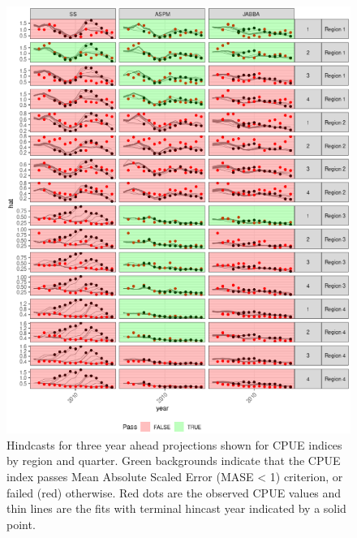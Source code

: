 \documentclass[12pt,halfline,a4paper,nonumbib]{ouparticle}
\begin{document}
\begin{figure}[htbp]
\centering
\includegraphics[width=6in]{fig5.eps}
\caption{Hindcasts for three year ahead projections shown for CPUE indices by region and quarter. Green backgrounds indicate that the CPUE index passes Mean Absolute Scaled Error (MASE < 1) criterion, or failed (red) otherwise. Red dots are the observed CPUE values and thin lines are the fits with terminal hincast year indicated by a solid point.}
\label{fig:hy3}
\end{figure}
\end{document}
